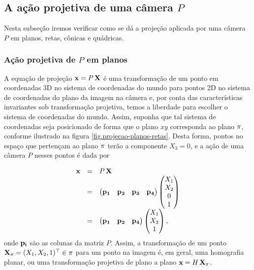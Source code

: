 \subsection{A ação projetiva de uma câmera $P$}
Nesta subseção iremos verificar como se dá a projeção aplicada por uma câmera $P$ em planos, retas, cônicas e quádricas.


\subsubsection*{Ação projetiva de $P$ em planos}
A equação de projeção $\mathbf{x}=P\,\mathbf{X}$ é uma transformação de um ponto em coordenadas 3D no sistema de coordenadas do mundo para pontos 2D no sistema de coordenadas do plano da imagem na câmera e, por conta das características invariantes sob transformação projetiva, temos a liberdade para escolher o sistema de coordenadas do mundo. Assim, suponha que tal sistema de coordenadas seja posicionado de forma que o plano $xy$ corresponda ao plano $\pi$, conforme ilustrado na figura \ref{fig.projecao-planos-retas}. Desta forma, pontos no espaço que pertençam ao plano $\pi$ terão a componente $X_3=0$, e a ação de uma câmera $P$ nesses pontos é dada por

\begin{equation*}
\begin{array}{rcl}
\mathbf{x}&=&P\,\mathbf{X}\\
&=&
\begin{pmatrix}
{\bf p_1}&{\bf p_2}&{\bf p_3}&{\bf p_4}
\end{pmatrix}
\begin{pmatrix}
X_1\\
X_2\\
0\\
1
\end{pmatrix}\\
&=&
\begin{pmatrix}
{\bf p_1}&{\bf p_2}&{\bf p_4}
\end{pmatrix}
\begin{pmatrix}
X_1\\
X_2\\
1
\end{pmatrix},
\end{array}
\end{equation*}
onde ${\bf p_i}$ são as colunas da matriz $P$. Assim, a transformação de um ponto $\mathbf{X}_\pi=(X_1,X_2,1)^\top\in\pi$ para um ponto na imagem é, em geral, uma homografia planar, ou uma transformação projetiva de plano a plano $\mathbf{x}=H\,\mathbf{X}_\pi$.


